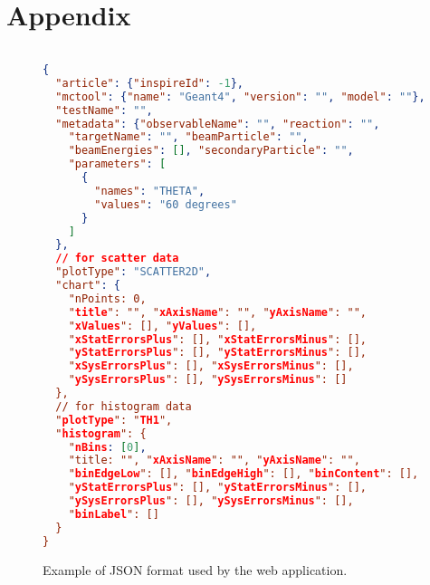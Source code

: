 \setcounter{figure}{0}
\renewcommand{\figurename}{Appendix}

\newpage
\section{Appendix}

\begin{figure}[h]

\begin{lstlisting}[language=json,firstnumber=1]
  
{
  "article": {"inspireId": -1},
  "mctool": {"name": "Geant4", "version": "", "model": ""},
  "testName": "",
  "metadata": {"observableName": "", "reaction": "",
    "targetName": "", "beamParticle": "",
    "beamEnergies": [], "secondaryParticle": "",
    "parameters": [
      {
        "names": "THETA",
        "values": "60 degrees"
      }
    ]
  },
  // for scatter data
  "plotType": "SCATTER2D",
  "chart": {
    "nPoints: 0,
    "title": "", "xAxisName": "", "yAxisName": "",
    "xValues": [], "yValues": [],
    "xStatErrorsPlus": [], "xStatErrorsMinus": [],
    "yStatErrorsPlus": [], "yStatErrorsMinus": [],
    "xSysErrorsPlus": [], "xSysErrorsMinus": [],
    "ySysErrorsPlus": [], "ySysErrorsMinus": []
  },
  // for histogram data
  "plotType": "TH1",
  "histogram": {
    "nBins: [0],
    "title: "", "xAxisName": "", "yAxisName": "",
    "binEdgeLow": [], "binEdgeHigh": [], "binContent": [],
    "yStatErrorsPlus": [], "yStatErrorsMinus": [],
    "ySysErrorsPlus": [], "ySysErrorsMinus": [],
    "binLabel": []
  }
}
\end{lstlisting}

\caption{Example of JSON format used by the web application.}
\label{adx:JSON-format}
\end{figure}


